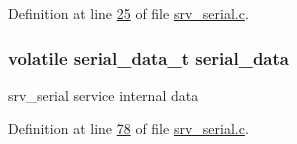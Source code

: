 Definition at line \hyperlink{a00030_source_l00025}{25} of file \hyperlink{a00030_source}{srv\+\_\+serial.\+c}.

\hypertarget{a00030_a77d3b77ccd59a0065642bf1ac7887b9d}{
\subsubsection[{serial\+\_\+data}]{\setlength{\rightskip}{0pt plus 5cm}volatile {\bf serial\+\_\+data\+\_\+t} serial\+\_\+data}}\label{a00030_a77d3b77ccd59a0065642bf1ac7887b9d}


srv\+\_\+serial service internal data 



Definition at line \hyperlink{a00030_source_l00078}{78} of file \hyperlink{a00030_source}{srv\+\_\+serial.\+c}.

